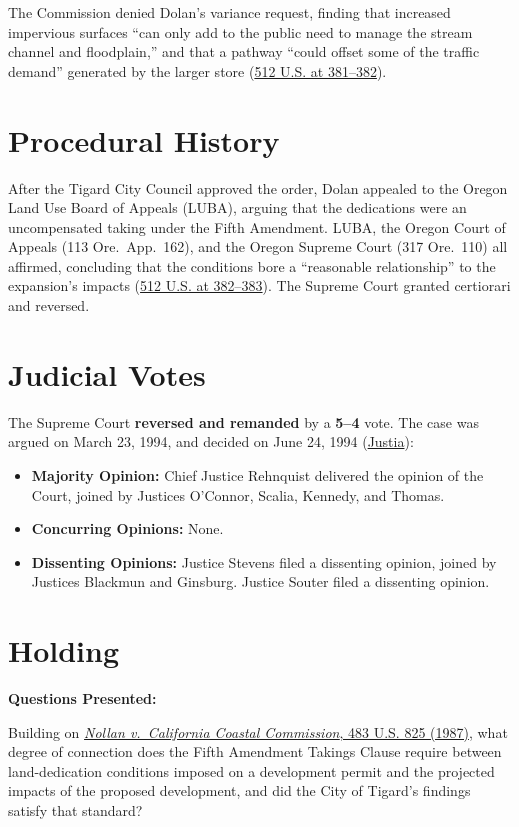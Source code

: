 \documentclass[12pt]{article}
\begin{document}
The Commission denied Dolan's variance request, finding that increased impervious surfaces ``can only add to the public need to manage the stream channel and floodplain,'' and that a pathway ``could offset some of the traffic demand'' generated by the larger store (\href{https://supreme.justia.com/cases/federal/us/512/374/}{512 U.S. at 381--382}).

\section{Procedural History}
After the Tigard City Council approved the order, Dolan appealed to the Oregon Land Use Board of Appeals (LUBA), arguing that the dedications were an uncompensated taking under the Fifth Amendment. LUBA, the Oregon Court of Appeals (113 Ore.\ App.\ 162), and the Oregon Supreme Court (317 Ore.\ 110) all affirmed, concluding that the conditions bore a ``reasonable relationship'' to the expansion's impacts (\href{https://supreme.justia.com/cases/federal/us/512/374/}{512 U.S. at 382--383}). The Supreme Court granted certiorari and reversed.

\section{Judicial Votes}
The Supreme Court \textbf{reversed and remanded} by a \textbf{5--4} vote. The case was argued on March 23, 1994, and decided on June 24, 1994 (\href{https://supreme.justia.com/cases/federal/us/512/374/}{Justia}):

\begin{itemize}
    \item \textbf{Majority Opinion:} Chief Justice Rehnquist delivered the opinion of the Court, joined by Justices O'Connor, Scalia, Kennedy, and Thomas.
    \item \textbf{Concurring Opinions:} None.
    \item \textbf{Dissenting Opinions:} Justice Stevens filed a dissenting opinion, joined by Justices Blackmun and Ginsburg. Justice Souter filed a dissenting opinion.
\end{itemize}

\section{Holding}
\textbf{Questions Presented:}

Building on \href{https://supreme.justia.com/cases/federal/us/483/825/}{\emph{Nollan v.\ California Coastal Commission}, 483 U.S. 825 (1987)}, what degree of connection does the Fifth Amendment Takings Clause require between land-dedication conditions imposed on a development permit and the projected impacts of the proposed development, and did the City of Tigard's findings satisfy that standard?
\end{document}
